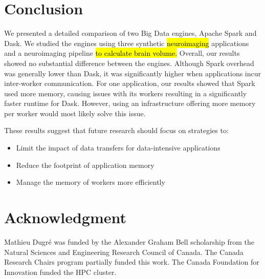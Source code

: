 \documentclass[AMA,STIX1COL]{WileyNJD-v2}
\newcommand{\HL}[1]{\hl{#1}}
\begin{document}
\section{Conclusion}
We presented a detailed comparison of two Big Data engines, Apache Spark and Dask.
We studied the engines using three synthetic \HL{neuroimaging} applications and 
a neuroimaging pipeline \HL{to calculate brain volume.}
Overall, our results showed no substantial difference between the engines.
Although Spark overhead was generally lower than Dask, it was significantly higher when applications incur inter-worker communication.
For one application, our results showed that Spark used more memory, causing issues with its workers resulting in a significantly faster runtime for Dask.
However, using an infrastructure offering more memory per worker would most likely solve this issue.
																					
These results suggest that future research should focus on strategies to:
\begin{itemize}
	\item Limit the impact of data transfers for data-intensive applications
	\item Reduce the footprint of application memory
	\item Manage the memory of workers more efficiently
\end{itemize}
																					
\section*{Acknowledgment}
Mathieu Dugr\'e was funded by the Alexander Graham Bell scholarship from
the Natural Sciences and Engineering Research Council of Canada.
The Canada Research Chairs program partially funded this work.
The Canada Foundation for Innovation funded the HPC cluster.
																		

\end{document}
